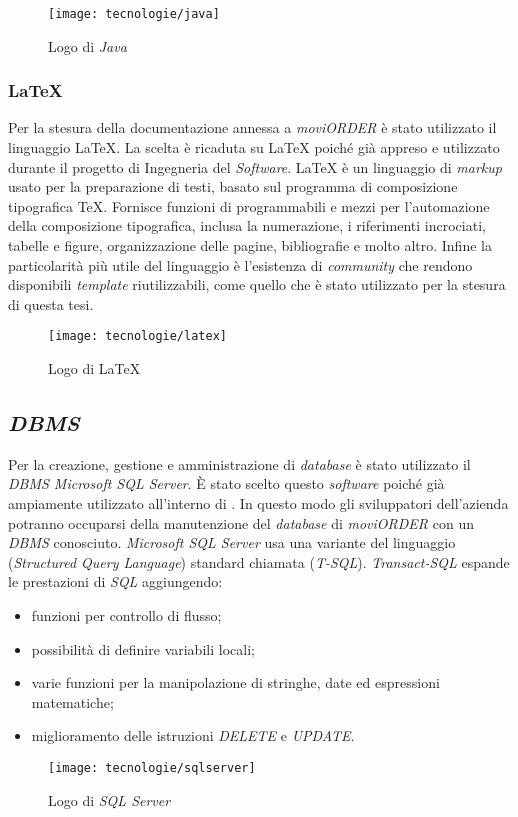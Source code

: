 \begin{figure}[!h] 
    \centering 
    \texttt{[image: tecnologie/java]} 
    \caption{Logo di \textit{Java}}
\end{figure}

\subsubsection{\LaTeX{}}

Per la stesura della documentazione annessa a \textit{moviORDER} è stato utilizzato il linguaggio \LaTeX{}. La scelta è ricaduta su \LaTeX{} poiché già appreso e utilizzato durante il progetto di Ingegneria del \textit{Software}. \LaTeX{} è un linguaggio di \textit{markup} usato per la preparazione di testi, basato sul programma di composizione tipografica \TeX{}. Fornisce funzioni di  programmabili e mezzi per l'automazione della composizione tipografica, inclusa la numerazione, i riferimenti incrociati, tabelle e figure, organizzazione delle pagine, bibliografie e molto altro. Infine la particolarità più utile del linguaggio è l'esistenza di \textit{community} che rendono disponibili \textit{template} riutilizzabili, come quello che è stato utilizzato per la stesura di questa tesi.

\begin{figure}[!h] 
    \centering 
    \texttt{[image: tecnologie/latex]} 
    \caption{Logo di \LaTeX{}}
\end{figure}

\subsection{\textit{DBMS}}

Per la creazione, gestione e amministrazione di \textit{database} è stato utilizzato il \textit{DBMS Microsoft SQL Server}. È stato scelto questo \textit{software} poiché già ampiamente utilizzato all'interno di \visione{}. In questo modo gli sviluppatori dell'azienda potranno occuparsi della manutenzione del \textit{database} di \textit{moviORDER} con un \textit{DBMS} conosciuto. \textit{Microsoft SQL Server} usa una variante del linguaggio  (\textit{Structured Query Language}) standard chiamata  (\textit{T-SQL}). \textit{Transact-SQL} espande le prestazioni di \textit{SQL} aggiungendo:
\begin{itemize}
	\item funzioni per controllo di flusso;
	\item possibilità di definire variabili locali;
	\item varie funzioni per la manipolazione di stringhe, date ed espressioni matematiche;
	\item miglioramento delle istruzioni \textit{DELETE} e \textit{UPDATE}.
\end{itemize}

\begin{figure}[!h] 
    \centering 
    \texttt{[image: tecnologie/sqlserver]} 
    \caption{Logo di \textit{SQL Server}}
\end{figure}